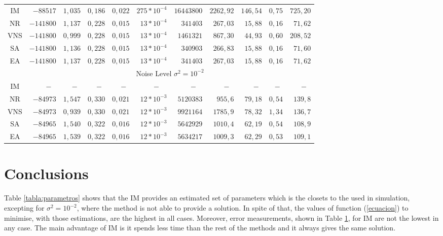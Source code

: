 \documentclass{sig-alternate}
\begin{document}
{\begin{table}
\begin{center}
{\begin{tabular}{c|rrrrr|rrrrr}
\hline
 			IM&$-88517$	&$1,035$	&$0,186$	&$0,022$	&$275*10^{-4}$ 	&$16443800$	&$2262,92$ 	&$146,54$	&$0,75$		&$725,20$	\\
 			NR&$-141800$	&$1,137$	&$0,228$	&$0,015$	&$13*10^{-4}$ &$341403$		&$267,03$	&$15,88$	&$0,16$		&$71,62$	\\
           VNS &$-141800$	&$0,999$	&$0,228$	&$0,015$	&$13*10^{-4}$	&$1461321$	&$867,30$ 	&$44,93$	&$0,60$		&$208,52$	\\
 			SA &$-141800$	&$1,136$	&$0,228$	&$0,015$	&$13*10^{-4}$	&$340903$		&$266,83$	&$15,88$	&$0,16$		&$71,60$	\\
 			EA &$-141800$	&$1,137$	&$0,228$	&$0,015$	&$13*10^{-4}$	&$341403$		&$267,03$	&$15,88$	&$0,16$		&$71,62$	\\
\hline
\hline
&\multicolumn{10}{c}{Noise Level $\sigma^2=  10^{-2}$} \\
\hline
 			IM 	&$-\ \ \ $				& $-\ \ $ 		&$-\ \ $		&$-\ \ $		& $-\ \ \ \ \ $		& $-\ \ \ \ $		&$-\ \ \ $		&$-\ \ $		 &$-\ \,$		&$-\ \ \,$\\
 			NR&$-84973$	&$1,547$	&$0,330$	&$0,021$	&$12*10^{-3}$ &$5120383$			&$955,6$	&$79,18$	&$0,54$		& $139,8$	\\
            VNS&$-84973$	&$0,939$	&$0,330$	&$0,021$	&$12*10^{-3}$	&$9921164$	& $1785,9$ 	&$78,32$	&$1,34$		& $136,7$	\\
 			SA &$-84965$	&$1,540$	&$0,322$	&$0,016$	&$12*10^{-3}$	&$5642929$			&$1010,4$	&$62,19$	&$0,54$	&$108,9$	\\
 			EA &$-84965$	&$1,539$	&$0,322$	&$0,016$	&$12*10^{-3}$	&$5634217$		&$1009,3$	&$62,29$	&$0,53$	&$109,1$	\\
\hline
\end{tabular}
}
\label{tabla:errores}\end{center}
\end{table}
}

\section{Conclusions}
\label{sec:Conclusion}

Table \ref{tabla:parametros} shows that the IM provides an estimated set of parameters which is the closets to the used in simulation, excepting for $\sigma^2=10^{-2}$, where the method is not able to provide a solution. In spite of that, the values of function (\ref{ecuacion}) to minimise, with those estimations, are the highest in all cases. Moreover, error measurements, shown in Table \ref{tabla:errores}, for IM are not the lowest in any case. The main advantage of IM is it spends less time than the rest of the methods and it always gives the same solution.
\end{document}
